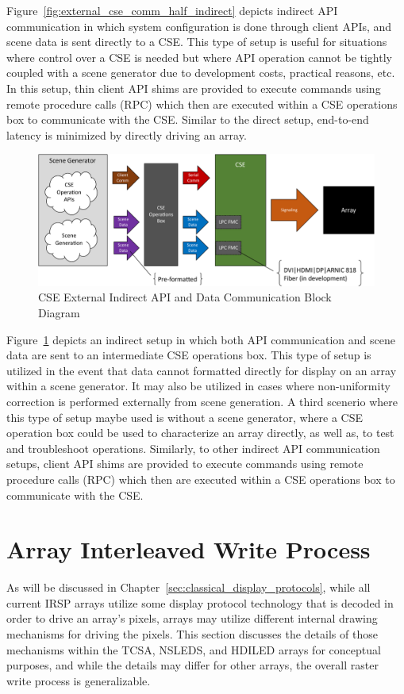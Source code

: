     Figure~\ref{fig:external_cse_comm_half_indirect} depicts indirect API communication in which system configuration is done through client APIs, and scene data is sent directly to a CSE. This type of setup is useful for situations where control over a CSE is needed but where API operation cannot be tightly coupled with a scene generator due to development costs, practical reasons, etc. In this setup, thin client API shims are provided to execute commands using remote procedure calls (RPC) which then are executed within a CSE operations box to communicate with the CSE. Similar to the direct setup, end-to-end latency is minimized by directly driving an array.

    \begin{figure}
        \centering
        \includegraphics[width=1.0\textwidth]{fig/external_cse_comm_indirect.pdf}
        \caption{CSE External Indirect API and Data Communication Block Diagram}
        \label{fig:external_cse_comm_indirect}
    \end{figure}

    Figure~\ref{fig:external_cse_comm_indirect} depicts an indirect setup in which both API communication and scene data are sent to an intermediate CSE operations box. This type of setup is utilized in the event that data cannot formatted directly for display on an array within a scene generator. It may also be utilized in cases where non-uniformity correction is performed externally from scene generation. A third scenerio where this type of setup maybe used is without a scene generator, where a CSE operation box could be used to characterize an array directly, as well as, to test and troubleshoot operations. Similarly, to other indirect API communication setups, client API shims are provided to execute commands using remote procedure calls (RPC) which then are executed within a CSE operations box to communicate with the CSE.

\section{Array Interleaved Write Process}
    \label{sec:array_Interleaved_write_process}
    As will be discussed in Chapter~\ref{sec:classical_display_protocols}, while all current IRSP arrays utilize some display protocol technology that is decoded in order to drive an array's pixels, arrays may utilize different internal drawing mechanisms for driving the pixels. This section discusses the details of those mechanisms within the TCSA, NSLEDS, and HDILED arrays for conceptual purposes, and while the details may differ for other arrays, the overall raster write process is generalizable.

